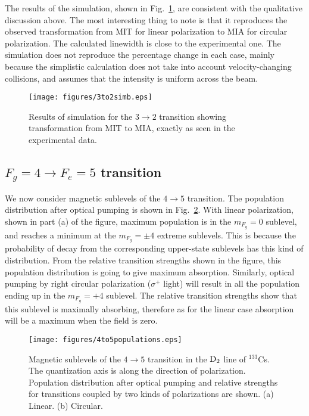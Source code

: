 \begin{enumerate}
The results of the simulation, shown in Fig.\ \ref{fig:3to2sim}, are consistent with the qualitative discussion above. The most interesting thing to note is that it reproduces the observed transformation from MIT for linear polarization to MIA for circular polarization. The calculated linewidth is close to the experimental one. The simulation does not reproduce the percentage change in each case, mainly because the simplistic calculation does not take into account velocity-changing collisions, and assumes that the intensity is uniform across the beam.

\begin{figure}
	\centering
	\texttt{[image: figures/3to2simb.eps]}
	\caption{Results of simulation for the $ 3 \rightarrow 2 $ transition showing transformation from MIT to MIA, exactly as seen in the experimental data.}
	\label{fig:3to2sim}
\end{figure}

\subsection{$ F_g = 4 \rightarrow F_e = 5 $ \rm {transition}}
We now consider magnetic sublevels of the $ 4 \rightarrow 5$ transition. The population distribution after optical pumping is shown in Fig.\ \ref{fig:4to5populations}. With linear polarization, shown in part (a) of the figure, maximum population is in the $ m_{F_g} = 0 $ sublevel, and reaches a minimum at the $ m_{F_g} = \pm 4 $ extreme sublevels. This is because the probability of decay from the corresponding upper-state sublevels has this kind of distribution. From the relative transition strengths shown in the figure, this population distribution is going to give maximum absorption. Similarly, optical pumping by right circular polarization ($ \sigma^+ $ light) will result in all the population ending up in the $ m_{F_g} = +4 $ sublevel. The relative transition strengths show that this sublevel is maximally absorbing, therefore as for the linear case absorption will be a maximum when the field is zero.

\begin{figure}
	\centering
	\texttt{[image: figures/4to5populations.eps]}
	\caption{Magnetic sublevels of the $ 4 \rightarrow 5 $ transition in the $\rm D_2 $ line of $^{133}$Cs. The quantization axis is along the direction of polarization. Population distribution after optical pumping and relative strengths for transitions coupled by two kinds of polarizations are shown. (a) Linear. (b) Circular.}
	\label{fig:4to5populations}
\end{figure}


\end{enumerate}
